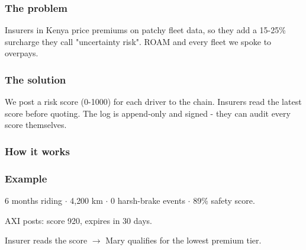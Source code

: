 \documentclass[11pt,a4paper]{article}
\begin{document}
\subsubsection{The problem}
Insurers in Kenya price premiums on patchy fleet data, so they add a 15-25\% surcharge they call "uncertainty risk". ROAM and every fleet we spoke to overpays.

\subsubsection{The solution}
We post a risk score (0-1000) for each driver to the chain. Insurers read the latest score before quoting. The log is append-only and signed - they can audit every score themselves.

\subsubsection{How it works}

\begin{center}
\end{center}

\subsubsection{Example}

\begin{scenariobox}[title=ROAM rider Mary Akinyi]
6 months riding $\cdot$ 4{,}200 km $\cdot$ 0 harsh-brake events $\cdot$ 89\% safety score.

\vspace{2pt}
AXI posts: score 920, expires in 30 days.

\vspace{2pt}
Insurer reads the score $\rightarrow$ Mary qualifies for the lowest premium tier.
\end{scenariobox}
\end{document}
